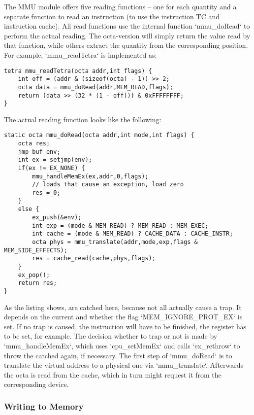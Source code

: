 The MMU module offers five reading functions -- one for each quantity and a separate function to read an instruction (to use the instruction TC and instruction cache). All read functions use the internal function `mmu_doRead` to perform the actual reading. The octa-version will simply return the value read by that function, while others extract the quantity from the corresponding position. For example, `mmu_readTetra` is implemented as:
\begin{lstlisting}[language=GIMMIXC,caption={Implementation of {\tt mmu\_readTetra}}]
tetra mmu_readTetra(octa addr,int flags) {
	int off = (addr & (sizeof(octa) - 1)) >> 2;
	octa data = mmu_doRead(addr,MEM_READ,flags);
	return (data >> (32 * (1 - off))) & 0xFFFFFFFF;
}
\end{lstlisting}
The actual reading function looks like the following:
\begin{lstlisting}[language=GIMMIXC,caption={Implementation of {\tt mmu\_doRead}}]
static octa mmu_doRead(octa addr,int mode,int flags) {
	octa res;
	jmp_buf env;
	int ex = setjmp(env);
	if(ex != EX_NONE) {
		mmu_handleMemEx(ex,addr,0,flags);
		// loads that cause an exception, load zero
		res = 0;
	}
	else {
		ex_push(&env);
		int exp = (mode & MEM_READ) ? MEM_READ : MEM_EXEC;
		int cache = (mode & MEM_READ) ? CACHE_DATA : CACHE_INSTR;
		octa phys = mmu_translate(addr,mode,exp,flags & MEM_SIDE_EFFECTS);
		res = cache_read(cache,phys,flags);
	}
	ex_pop();
	return res;
}
\end{lstlisting}
As the listing shows,  are catched here, because not all  actually cause a trap. It depends on the current  and whether the flag `MEM_IGNORE_PROT_EX` is set. If no trap is caused, the instruction will have to be finished, \ie the register has to be set, for example. The decision whether to trap or not is made by `mmu_handleMemEx`, which uses `cpu_setMemEx` and calls `ex_rethrow` to throw the catched  again, if necessary. The first step of `mmu_doRead` is to translate the virtual address to a physical one via `mmu_translate`. Afterwards the octa is read from the cache, which in turn might request it from the corresponding device.

\subsubsection{Writing to Memory}

